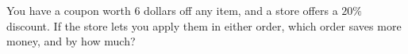 You have a coupon worth $6$ dollars off any item, and a store offers a $20\%$ discount. If the store lets you apply them in either order, which order saves more money, and by how much?
